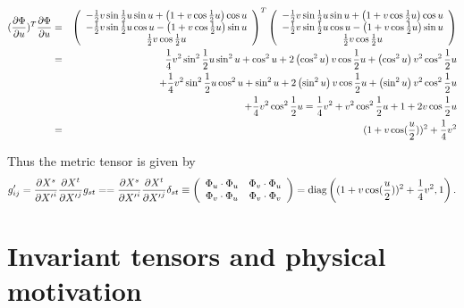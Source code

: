 \begin{eqnarray}
(\frac{\partial \Phi }{\partial u})^{T}\frac{\partial \Phi }{\partial u}&=&\allowbreak \left(
\begin{array}{c}
-\frac{1}{2}v\sin \frac{1}{2}u\sin u+\left( 1+v\cos \frac{1}{2}u\right) \cos
u \\
-\frac{1}{2}v\sin \frac{1}{2}u\cos u-\left( 1+v\cos \frac{1}{2}u\right) \sin
u \\
\frac{1}{2}v\cos \frac{1}{2}u
\end{array}
\right) ^{T}\left(
\begin{array}{c}
-\frac{1}{2}v\sin \frac{1}{2}u\sin u+\left( 1+v\cos \frac{1}{2}u\right) \cos
u \\
-\frac{1}{2}v\sin \frac{1}{2}u\cos u-\left( 1+v\cos \frac{1}{2}u\right) \sin
u \\
\frac{1}{2}v\cos \frac{1}{2}u
\end{array}
\right)
\nonumber \\
&=&
\frac{1}{4}v^{2}\sin ^{2}\frac{1}{2}u\sin ^{2}u+\cos
^{2}u+2\left( \cos ^{2}u\right) v\cos \frac{1}{2}u+\left( \cos ^{2}u\right)
v^{2}\cos ^{2}\frac{1}{2}u
\nonumber \\
&&
+\frac{1}{4}v^{2}\sin ^{2}\frac{1}{2}u\cos
^{2}u
+\sin ^{2}u+2\left( \sin ^{2}u\right) v\cos \frac{1}{2}u+\left( \sin
^{2}u\right) v^{2}\cos ^{2}\frac{1}{2}u
\nonumber \\
&&
+\frac{1}{4}v^{2}\cos ^{2}\frac{1}{2}%
u =\allowbreak \frac{1}{4}v^{2}+v^{2}\cos ^{2}\frac{1}{2}u+1+2v\cos \frac{%
1}{2}u
\nonumber \\
&=&(1+v\cos (\frac{u}{2}))^{2}+\frac{1}{4}v^{2}
\end{eqnarray}


Thus the metric tensor is given by
\begin{equation}
g'_{ij}
= {\partial {X}^s\over \partial {X'}^i}{\partial {X}^t\over \partial {X'}^j}g_{st}=
= {\partial {X}^s\over \partial {X'}^i}{\partial {X}^t\over \partial {X'}^j}\delta_{st}\equiv
\left(
\begin{array}{cc}
\Phi _{u}\cdot \Phi _{u} & \Phi _{v}\cdot \Phi _{u} \\
\Phi _{v}\cdot \Phi _{u} & \Phi _{v}\cdot \Phi _{v}
\end{array}
\right) ={\rm diag}\left(
(1+v\cos (\frac{u}{2}))^{2}+\frac{1}{4}v^{2} , 1\right).
\end{equation}



\section{Invariant tensors and physical motivation}

